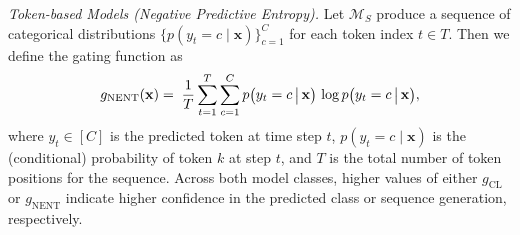 \emph{Token-based Models (Negative Predictive Entropy).} 
Let \(\mathcal{M}_S\) produce a sequence of categorical distributions 
\(\{p(y_t = c \mid \mathbf{x})\}_{c=1}^C\) for each token index \(t \in T\). Then we define the gating function as
\begin{equation}
\footnotesize
g_{\text{NENT}}(\mathbf{x}) 
= \; \frac{1}{T} \sum_{t=1}^{T} \sum_{c=1}^{C} 
    p\bigl(y_t = c \,\big\vert\, \mathbf{x}\bigr)\,\log p\bigl(y_t = c \,\big\vert\, \mathbf{x}\bigr),
\end{equation}
where \(y_t \in [C]\) is the predicted token at time step \(t\), \(p(y_t=c \mid \mathbf{x})\) is the (conditional) probability of token \(k\) at step \(t\), and \(T\) is the total number of token positions for the sequence. Across both model classes, higher values of either $g_{\text{CL}}$ or $g_{\text{NENT}}$ indicate higher confidence in the predicted class or sequence generation, respectively.



    



